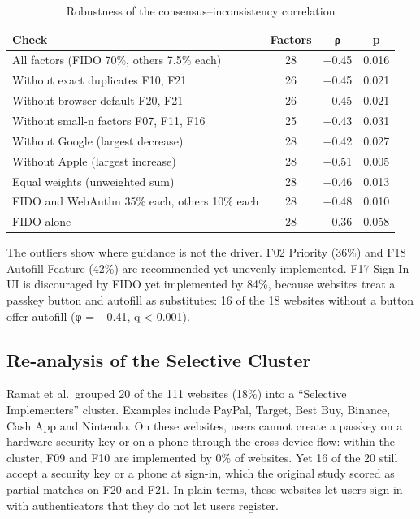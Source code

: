 \documentclass[letterpaper,twocolumn,10pt]{article}
\begin{document}
\begin{table}[t]\centering\footnotesize\setlength{\tabcolsep}{3pt}\caption{Robustness of the consensus--inconsistency correlation}\label{tab:3}
\begin{tabularx}{\columnwidth}{Xccc}\toprule
\textbf{Check} & \textbf{Factors} & \textbf{ρ} & \textbf{p} \\ \midrule
All factors (FIDO 70\%, others 7.5\% each) & 28 & −0.45 & 0.016 \\
Without exact duplicates F10, F21 & 26 & −0.45 & 0.021 \\
Without browser-default F20, F21 & 26 & −0.45 & 0.021 \\
Without small-n factors F07, F11, F16 & 25 & −0.43 & 0.031 \\
Without Google (largest decrease) & 28 & −0.42 & 0.027 \\
Without Apple (largest increase) & 28 & −0.51 & 0.005 \\
Equal weights (unweighted sum) & 28 & −0.46 & 0.013 \\
FIDO and WebAuthn 35\% each, others 10\% each & 28 & −0.48 & 0.010 \\
FIDO alone & 28 & −0.36 & 0.058 \\
\bottomrule\end{tabularx}\end{table}

The outliers show where guidance is not the driver. F02 Priority (36\%) and F18 Autofill-Feature (42\%) are recommended yet unevenly implemented. F17 Sign-In-UI is discouraged by FIDO yet implemented by 84\%, because websites treat a passkey button and autofill as substitutes: 16 of the 18 websites without a button offer autofill (φ = −0.41, q \textless{} 0.001).

\subsection{Re-analysis of the Selective Cluster}

Ramat et al.~grouped 20 of the 111 websites (18\%) into a ``Selective Implementers'' cluster. Examples include PayPal, Target, Best Buy, Binance, Cash App and Nintendo. On these websites, users cannot create a passkey on a hardware security key or on a phone through the cross-device flow: within the cluster, F09 and F10 are implemented by 0\% of websites. Yet 16 of the 20 still accept a security key or a phone at sign-in, which the original study scored as partial matches on F20 and F21. In plain terms, these websites let users sign in with authenticators that they do not let users register.
\end{document}
